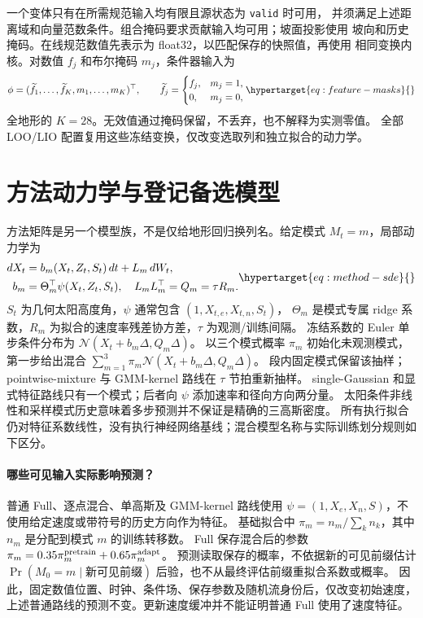 一个变体只有在所需规范输入均有限且源状态为 \texttt{valid} 时可用，
并须满足上述距离域和向量范数条件。组合掩码要求贡献输入均可用；坡面投影使用
坡向和历史掩码。在线规范数值先表示为 float32，以匹配保存的快照值，再使用
相同变换内核。对数值 \(f_j\) 和布尔掩码 \(m_j\)，条件器输入为
\begin{equation}
\phi=(\widetilde f_1,\ldots,\widetilde f_K,m_1,\ldots,m_K)^\top,
\qquad \widetilde f_j=
\begin{cases}f_j,&m_j=1,\\0,&m_j=0,\end{cases}
\label{eq:feature-masks}\hypertarget{eq:feature-masks}{}
\end{equation}
全地形的 \(K=28\)。无效值通过掩码保留，不丢弃，也不解释为实测零值。
全部 LOO/LIO 配置复用这些冻结变换，仅改变选取列和独立拟合的动力学。


\section{方法动力学与登记备选模型}
\label{sec:method-model}\hypertarget{sec:method-model}{}
方法矩阵是另一个模型族，不是仅给地形回归换列名。给定模式 \(M_t=m\)，局部动力学为
\begin{equation}
\begin{aligned}
dX_t&=b_m(X_t,Z_t,S_t)\,dt+L_m\,dW_t,\\
b_m&=\Theta_m^\top\psi(X_t,Z_t,S_t),\quad L_mL_m^\top=Q_m=\tau R_m.
\end{aligned}
\label{eq:method-sde}\hypertarget{eq:method-sde}{}
\end{equation}
\(S_t\) 为几何太阳高度角，\(\psi\) 通常包含 \((1,X_{t,e},X_{t,n},S_t)\)，
\(\Theta_m\) 是模式专属 ridge 系数，\(R_m\) 为拟合的速度率残差协方差，\(\tau\) 为观测/训练间隔。
冻结系数的 Euler 单步条件分布为 \(\mathcal N(X_t+b_m\Delta,Q_m\Delta)\)。
以三个模式概率 \(\pi_m\) 初始化未观测模式，第一步给出混合
\(\sum_{m=1}^3\pi_m\mathcal N(X_t+b_m\Delta,Q_m\Delta)\)。
段内固定模式保留该抽样；pointwise-mixture 与 GMM-kernel 路线在 \(\tau\) 节拍重新抽样。
single-Gaussian 和显式特征路线只有一个模式；后者向 \(\psi\) 添加速率和径向方向两分量。
太阳条件非线性和采样模式历史意味着多步预测并不保证是精确的三高斯密度。
所有执行拟合仍对特征系数线性，没有执行神经网络基线；混合模型名称与实际训练划分规则如下区分。

\paragraph{哪些可见输入实际影响预测？}
普通 Full、逐点混合、单高斯及 GMM-kernel 路线使用
\(\psi=(1,X_e,X_n,S)\)，不使用给定速度或带符号的历史方向作为特征。
基础拟合中 \(\pi_m=n_m/\sum_k n_k\)，其中 \(n_m\) 是分配到模式 \(m\) 的训练转移数。
Full 保存混合后的参数
\(\pi_m=0.35\pi_m^{\rm pretrain}+0.65\pi_m^{\rm adapt}\)。
预测读取保存的概率，不依据新的可见前缀估计
\(\Pr(M_0=m\mid\text{新可见前缀})\) 后验，也不从最终评估前缀重拟合系数或概率。
因此，固定数值位置、时钟、条件场、保存参数及随机流身份后，仅改变初始速度，
上述普通路线的预测不变。更新速度缓冲并不能证明普通 Full 使用了速度特征。

